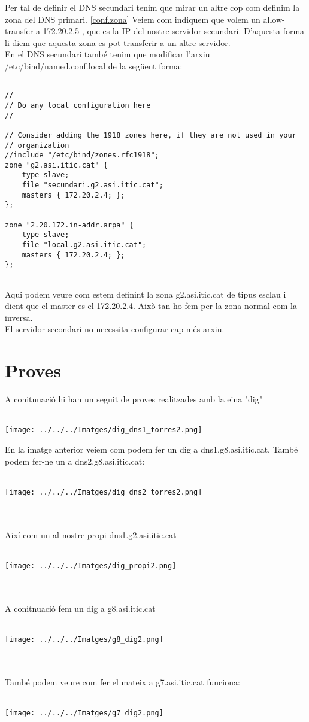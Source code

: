 \documentclass[11p]{article}
\begin{document}
Per tal de definir el DNS secundari tenim que mirar un altre cop com definim la zona del DNS primari. \ref{conf.zona}
Veiem com indiquem que volem un allow-transfer	a 172.20.2.5 , que es la IP del nostre servidor secundari. D'aquesta forma li diem que aquesta zona es pot transferir a un altre servidor.\\
En el DNS secundari també tenim que modificar l'arxiu /etc/bind/named.conf.local de la següent forma:
\begin{lstlisting}

//
// Do any local configuration here
//

// Consider adding the 1918 zones here, if they are not used in your
// organization
//include "/etc/bind/zones.rfc1918";
zone "g2.asi.itic.cat" {
	type slave;
	file "secundari.g2.asi.itic.cat";
	masters { 172.20.2.4; };
};

zone "2.20.172.in-addr.arpa" {
	type slave;
	file "local.g2.asi.itic.cat";
	masters { 172.20.2.4; };
};


\end{lstlisting}

Aqui podem veure com estem definint la zona g2.asi.itic.cat de tipus esclau i dient que el master es el 172.20.2.4. Això tan ho fem per la zona normal com la inversa.\\

El servidor secondari no necessita configurar cap més arxiu.
\newpage 
\section{Proves}

A conitnuació hi han un seguit de proves realitzades amb la eina "dig"\\\\
\centerline{\texttt{[image: ../../../Imatges/dig\_dns1\_torres2.png]} }
En la imatge anterior veiem com podem fer un dig a dns1.g8.asi.itic.cat. També podem fer-ne un a dns2.g8.asi.itic.cat:\\\\
\centerline{\texttt{[image: ../../../Imatges/dig\_dns2\_torres2.png]} }\\\\
Així com un al nostre propi dns1.g2.asi.itic.cat\\\\
\centerline{\texttt{[image: ../../../Imatges/dig\_propi2.png]} }\\\\
A conitnuació fem un dig a g8.asi.itic.cat\\\\
\centerline{\texttt{[image: ../../../Imatges/g8\_dig2.png]} }\\\\
També podem veure com fer el mateix a g7.asi.itic.cat funciona:\\\\
\centerline{\texttt{[image: ../../../Imatges/g7\_dig2.png]} }\\\\
\end{document}

